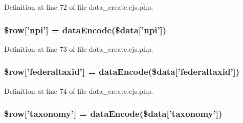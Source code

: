 \-Definition at line 72 of file data\-\_\-create.\-ejs.\-php.

\hypertarget{miscellaneous_2mysettings_2data__create_8ejs_8php_ae8acb53d6d8e83580307a5aa95fd2304}{
\subsubsection[{\$row}]{\setlength{\rightskip}{0pt plus 5cm}\$row\mbox{[}'npi'\mbox{]} = {\bf data\-Encode}(\$data\mbox{[}'npi'\mbox{]})}}\label{miscellaneous_2mysettings_2data__create_8ejs_8php_ae8acb53d6d8e83580307a5aa95fd2304}


\-Definition at line 73 of file data\-\_\-create.\-ejs.\-php.

\hypertarget{miscellaneous_2mysettings_2data__create_8ejs_8php_a276b7e7d1682582d07599773e5677ad1}{
\subsubsection[{\$row}]{\setlength{\rightskip}{0pt plus 5cm}\$row\mbox{[}'federaltaxid'\mbox{]} = {\bf data\-Encode}(\$data\mbox{[}'federaltaxid'\mbox{]})}}\label{miscellaneous_2mysettings_2data__create_8ejs_8php_a276b7e7d1682582d07599773e5677ad1}


\-Definition at line 74 of file data\-\_\-create.\-ejs.\-php.

\hypertarget{miscellaneous_2mysettings_2data__create_8ejs_8php_ac3ee7cf124d7401bbb138317989b316c}{
\subsubsection[{\$row}]{\setlength{\rightskip}{0pt plus 5cm}\$row\mbox{[}'taxonomy'\mbox{]} = {\bf data\-Encode}(\$data\mbox{[}'taxonomy'\mbox{]})}}\label{miscellaneous_2mysettings_2data__create_8ejs_8php_ac3ee7cf124d7401bbb138317989b316c}


